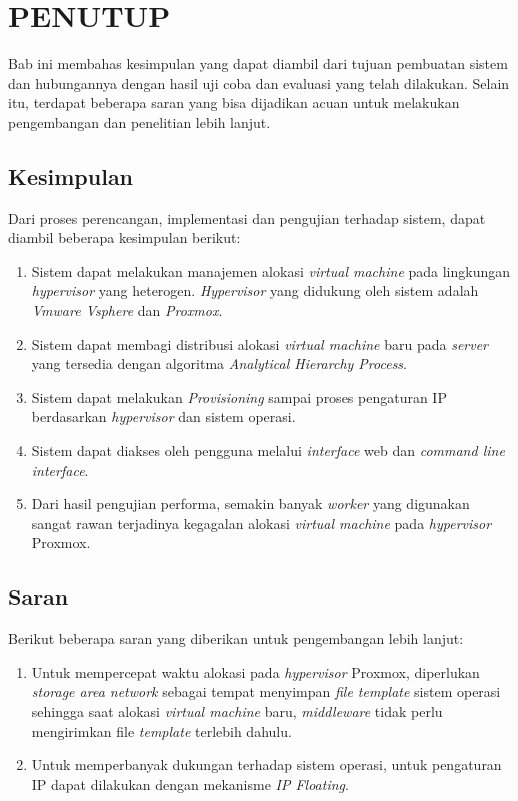 \chapter{PENUTUP}
    Bab ini membahas kesimpulan yang dapat diambil dari tujuan pembuatan sistem dan hubungannya dengan hasil uji coba dan evaluasi yang telah dilakukan. Selain itu, terdapat beberapa saran yang bisa dijadikan acuan untuk melakukan pengembangan dan penelitian lebih lanjut.
        
	\section{Kesimpulan}
        Dari proses perencangan, implementasi dan pengujian terhadap sistem, dapat diambil beberapa kesimpulan berikut:
		\begin{enumerate}
            \item Sistem dapat melakukan manajemen alokasi \textit{virtual machine} pada lingkungan \textit{hypervisor} yang heterogen. \textit{Hypervisor} yang didukung oleh sistem adalah \textit{Vmware Vsphere} dan \textit{Proxmox}.
            \item Sistem dapat membagi distribusi alokasi \textit{virtual machine} baru pada \textit{server} yang tersedia dengan algoritma \textit{Analytical Hierarchy Process}.
            \item Sistem dapat melakukan \textit{Provisioning} sampai proses pengaturan IP berdasarkan \textit{hypervisor} dan sistem operasi.
            \item Sistem dapat diakses oleh pengguna melalui \textit{interface} web dan \textit{command line interface}.
            \item Dari hasil pengujian performa, semakin banyak \textit{worker} yang digunakan sangat rawan terjadinya kegagalan alokasi \textit{virtual machine} pada \textit{hypervisor} Proxmox.
		\end{enumerate}
        
	\section{Saran}
		Berikut beberapa saran yang diberikan untuk pengembangan lebih lanjut:
		\begin{enumerate}
			\item Untuk mempercepat waktu alokasi pada \textit{hypervisor} Proxmox, diperlukan \textit{storage area network} sebagai tempat menyimpan \textit{file template} sistem operasi sehingga saat alokasi \textit{virtual machine} baru, \textit{middleware} tidak perlu mengirimkan file \textit{template} terlebih dahulu.
            \item Untuk memperbanyak dukungan terhadap sistem operasi, untuk pengaturan IP dapat dilakukan dengan mekanisme \textit{IP Floating}.
		\end{enumerate}